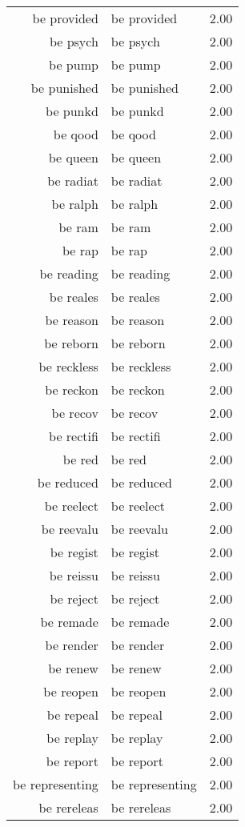 \begin{table}[ht]
\begin{tabular}{rlr}
  be provided & be provided & 2.00 \\ 
  be psych & be psych & 2.00 \\ 
  be pump & be pump & 2.00 \\ 
  be punished & be punished & 2.00 \\ 
  be punkd & be punkd & 2.00 \\ 
  be qood & be qood & 2.00 \\ 
  be queen & be queen & 2.00 \\ 
  be radiat & be radiat & 2.00 \\ 
  be ralph & be ralph & 2.00 \\ 
  be ram & be ram & 2.00 \\ 
  be rap & be rap & 2.00 \\ 
  be reading & be reading & 2.00 \\ 
  be reales & be reales & 2.00 \\ 
  be reason & be reason & 2.00 \\ 
  be reborn & be reborn & 2.00 \\ 
  be reckless & be reckless & 2.00 \\ 
  be reckon & be reckon & 2.00 \\ 
  be recov & be recov & 2.00 \\ 
  be rectifi & be rectifi & 2.00 \\ 
  be red & be red & 2.00 \\ 
  be reduced & be reduced & 2.00 \\ 
  be reelect & be reelect & 2.00 \\ 
  be reevalu & be reevalu & 2.00 \\ 
  be regist & be regist & 2.00 \\ 
  be reissu & be reissu & 2.00 \\ 
  be reject & be reject & 2.00 \\ 
  be remade & be remade & 2.00 \\ 
  be render & be render & 2.00 \\ 
  be renew & be renew & 2.00 \\ 
  be reopen & be reopen & 2.00 \\ 
  be repeal & be repeal & 2.00 \\ 
  be replay & be replay & 2.00 \\ 
  be report & be report & 2.00 \\ 
  be representing & be representing & 2.00 \\ 
  be rereleas & be rereleas & 2.00 \\ 

\end{tabular}
\end{table}

